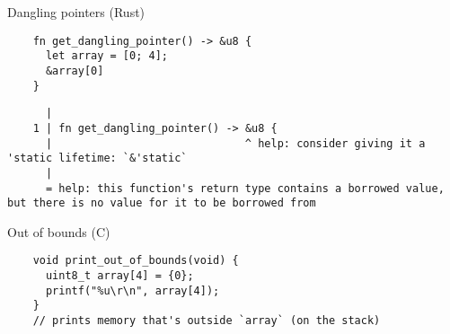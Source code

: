 \begin{frame}[fragile]{Dangling pointers (Rust)}

  \begin{verbatim}
    fn get_dangling_pointer() -> &u8 {
      let array = [0; 4];
      &array[0]
    }
  \end{verbatim}
  
  \begin{verbatim}
      |
    1 | fn get_dangling_pointer() -> &u8 {
      |                              ^ help: consider giving it a 'static lifetime: `&'static`
      |
      = help: this function's return type contains a borrowed value, but there is no value for it to be borrowed from
  \end{verbatim}


\end{frame}

\begin{frame}[fragile]{Out of bounds (C)}
  \begin{verbatim}
    void print_out_of_bounds(void) {
      uint8_t array[4] = {0};
      printf("%u\r\n", array[4]);
    }
    // prints memory that's outside `array` (on the stack)
  \end{verbatim}

\end{frame}

